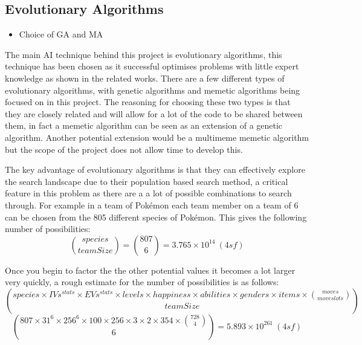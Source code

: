 \documentclass[a4paper]{article}
\newcommand{\Pokemon}{Pok\'{e}mon}
\begin{document}
\subsection{Evolutionary Algorithms}
\begin{itemize}
   \item Choice of GA and MA
\end{itemize}
\par
The main AI technique behind this project is evolutionary algorithms, this technique has been chosen as it successful optimises problems with little expert knowledge as shown in the related works.
There are a few different types of evolutionary algorithms, with genetic algorithms and memetic algorithms being focused on in this project.
The reasoning for choosing these two types is that they are closely related and will allow for a lot of the code to be shared between them, in fact a memetic algorithm can be seen as an extension of a genetic algorithm.
Another potential extension would be a multimeme memetic algorithm but the scope of the project does not allow time to develop this.
\par
The key advantage of evolutionary algorithms is that they can effectively explore the search landscape due to their population based search method, a critical feature in this problem as there are a a lot of possible combinations to search through.
For example in a team of \Pokemon{} each team member on a team of 6 can be chosen from the 805 different species of \Pokemon{}.
This gives the following number of possibilities:
\begin{equation}
{species \choose teamSize} = {807 \choose 6} = 3.765 \times 10^{14}\ (4sf) %
\end{equation}
\par
Once you begin to factor the the other potential values it becomes a lot larger very quickly, a rough estimate for the number of possibilities is as follows:
\begin{equation}
{species \times IVs^{stats} \times EVs^{stats} \times levels \times happiness \times abilities \times genders \times items \times {moves \choose move slots} \choose teamSize}
\end{equation}
\begin{equation}
    {807 \times 31^6 \times 256^6 \times 100 \times 256 \times 3 \times 2 \times 354 \times {728 \choose 4} \choose 6} = 5.893 \times 10^{261}\ (4sf)
\end{equation} %
\end{document}
